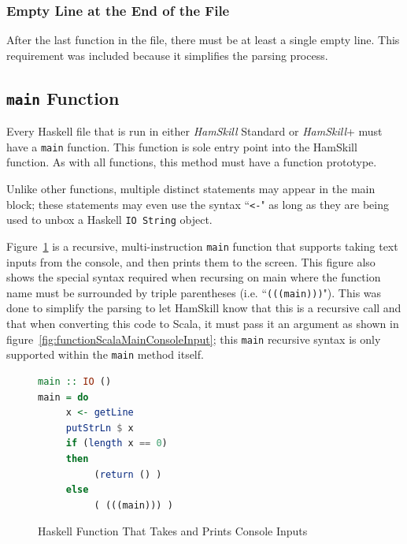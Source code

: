 \documentclass{report}
\begin{document}
\subsubsection{Empty Line at the End of the File}

After the last function in the file, there must be at least a single empty line.  This requirement was included because it simplifies the parsing process.

\subsection{\texttt{main} Function}

Every Haskell file that is run in either \textit{HamSkill} Standard or \textit{HamSkill}+ must have a \texttt{main} function.  This function is sole entry point into the HamSkill function.  As with all functions, this method must have a function prototype.

Unlike other functions, multiple distinct statements may appear in the main block; these statements may even use the syntax ``\texttt{<-}" as long as they are being used to unbox a Haskell \texttt{IO String} object.

Figure~\ref{fig:functionHaskellMainConsoleInput} is a recursive, multi-instruction \texttt{main} function that supports taking text inputs from the console, and then prints them to the screen.  This figure also shows the special syntax required when recursing on main where the function name must be surrounded by triple parentheses (i.e. ``\texttt{(((main)))}").  This was done to simplify the parsing to let HamSkill know that this is a recursive call and that when converting this code to Scala, it must pass it an argument as shown in figure~\ref{fig:functionScalaMainConsoleInput}; this \texttt{main} recursive syntax is only supported within the \texttt{main} method itself.

\begin{figure}[H]
\begin{mdframed}
\begin{lstlisting}[language=Haskell]
main :: IO ()
main = do 
     x <- getLine 
     putStrLn $ x
     if (length x == 0) 
     then 
          (return () )
     else
          ( (((main))) )
\end{lstlisting}
\end{mdframed}
\caption{Haskell Function That Takes and Prints Console Inputs}\label{fig:functionHaskellMainConsoleInput}
\end{figure}
\end{document}
